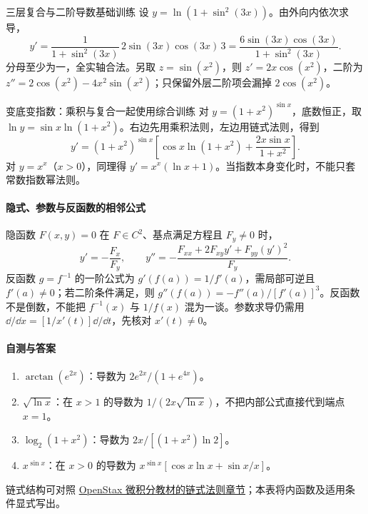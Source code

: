 \begin{example}{三层复合与二阶导数}{基础训练}
设 $y=\ln(1+\sin^2(3x))$。由外向内依次求导，
\[
 y'=\frac{1}{1+\sin^2(3x)}\,2\sin(3x)\cos(3x)\,3
 =\frac{6\sin(3x)\cos(3x)}{1+\sin^2(3x)}.
\]
分母至少为一，全实轴合法。另取 $z=\sin(x^2)$，则 $z'=2x\cos(x^2)$，二阶为 $z''=2\cos(x^2)-4x^2\sin(x^2)$；只保留外层二阶项会漏掉 $2\cos(x^2)$。
\end{example}

\begin{example}{变底变指数：乘积与复合一起使用}{综合训练}
对 $y=(1+x^2)^{\sin x}$，底数恒正，取 $\ln y=\sin x\ln(1+x^2)$。右边先用乘积法则，左边用链式法则，得到
\[
 y'=(1+x^2)^{\sin x}\left[\cos x\ln(1+x^2)+\frac{2x\sin x}{1+x^2}\right].
\]
对 $y=x^x$（$x>0$），同理得 $y'=x^x(\ln x+1)$。当指数本身变化时，不能只套常数指数幂法则。
\end{example}

\paragraph{隐式、参数与反函数的相邻公式}
隐函数 $F(x,y)=0$ 在 $F\in C^2$、基点满足方程且 $F_y\ne0$ 时，
\[
 y'=-\frac{F_x}{F_y},\qquad
 y''=-\frac{F_{xx}+2F_{xy}y'+F_{yy}(y')^2}{F_y}.
\]
反函数 $g=f^{-1}$ 的一阶公式为 $g'(f(a))=1/f'(a)$，需局部可逆且 $f'(a)\ne0$；若二阶条件满足，则 $g''(f(a))=-f''(a)/[f'(a)]^3$。反函数不是倒数，不能把 $f^{-1}(x)$ 与 $1/f(x)$ 混为一谈。参数求导仍需用 $\dd/\dd x=[1/x'(t)]\dd/\dd t$，先核对 $x'(t)\ne0$。

\paragraph{自测与答案}
\begin{enumerate}
\item $\arctan(e^{2x})$：导数为 $2e^{2x}/(1+e^{4x})$。
\item $\sqrt{\ln x}$：在 $x>1$ 的导数为 $1/(2x\sqrt{\ln x})$，不把内部公式直接代到端点 $x=1$。
\item $\log_2(1+x^2)$：导数为 $2x/[(1+x^2)\ln2]$。
\item $x^{\sin x}$：在 $x>0$ 的导数为 $x^{\sin x}[\cos x\ln x+\sin x/x]$。
\end{enumerate}
链式结构可对照 \href{https://openstax.org/books/calculus-volume-1/pages/3-6-the-chain-rule}{OpenStax 微积分教材的链式法则章节}；本表将内函数及适用条件显式写出。
